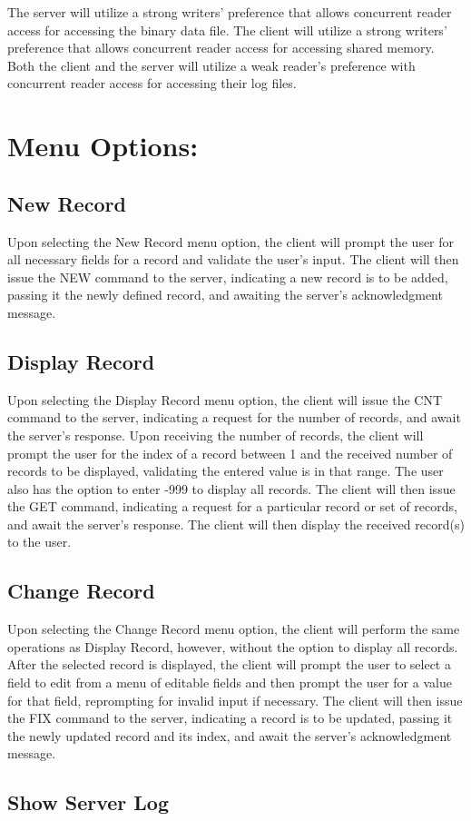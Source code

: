The server will utilize a strong writers' preference that allows concurrent reader access for accessing the binary data file. The client will utilize a strong writers' preference that allows concurrent reader access for accessing shared memory. Both the client and the server will utilize a weak reader's preference with concurrent reader access for accessing their log files. \hypertarget{index_menu}{}\section{Menu Options\-:}\label{index_menu}
\hypertarget{index_new_record}{}\subsection{New Record}\label{index_new_record}
Upon selecting the New Record menu option, the client will prompt the user for all necessary fields for a record and validate the user's input. The client will then issue the N\-E\-W command to the server, indicating a new record is to be added, passing it the newly defined record, and awaiting the server's acknowledgment message. \hypertarget{index_display_record}{}\subsection{Display Record}\label{index_display_record}
Upon selecting the Display Record menu option, the client will issue the C\-N\-T command to the server, indicating a request for the number of records, and await the server's response. Upon receiving the number of records, the client will prompt the user for the index of a record between 1 and the received number of records to be displayed, validating the entered value is in that range. The user also has the option to enter -\/999 to display all records. The client will then issue the G\-E\-T command, indicating a request for a particular record or set of records, and await the server's response. The client will then display the received record(s) to the user. \hypertarget{index_change_record}{}\subsection{Change Record}\label{index_change_record}
Upon selecting the Change Record menu option, the client will perform the same operations as Display Record, however, without the option to display all records. After the selected record is displayed, the client will prompt the user to select a field to edit from a menu of editable fields and then prompt the user for a value for that field, reprompting for invalid input if necessary. The client will then issue the F\-I\-X command to the server, indicating a record is to be updated, passing it the newly updated record and its index, and await the server's acknowledgment message. \hypertarget{index_show_log}{}\subsection{Show Server Log}\label{index_show_log}
